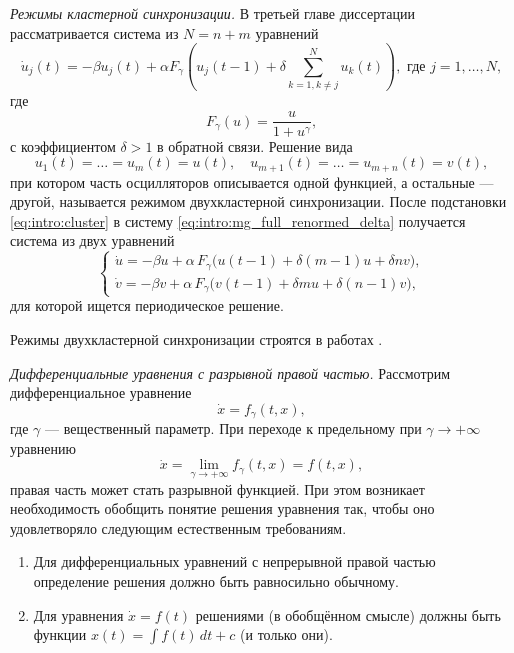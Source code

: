 \textit{Режимы кластерной синхронизации.} 
В третьей главе диссертации рассматривается система из $N = n + m$ уравнений
\begin{equation}
	\label{eq:intro:mg_full_renormed_delta}
	\dot{u}_j(t) = -\beta u_j(t) + \alpha F_{\gamma} \left(u_j(t - 1) + \delta\sum\limits_{k = 1, k\neq j}^N u_k(t)\right), \text{ где } j = 1, \dots, N,
\end{equation}
где
\[
F_{\gamma}(u) = \dfrac{u}{1 + u^{\gamma}},
\]
с коэффициентом $\delta > 1$ в обратной связи. Решение вида 
\begin{equation}
	\label{eq:intro:cluster}
	u_1(t)=\ldots=u_m(t) = u(t),\quad u_{m+1}(t)=\ldots=u_{m+n}(t) = v(t),
\end{equation}
при котором часть осцилляторов описывается одной функцией, а остальные --- другой, называется режимом двухкластерной синхронизации. После подстановки \eqref{eq:intro:cluster} в систему \eqref{eq:intro:mg_full_renormed_delta} получается система из двух уравнений
%
\begin{equation}
	\label{eq:intro:system_uv}
	\begin{cases}
		\dot{u} = -\beta u + \alpha \, F_{\gamma} \big(u(t - 1) + \delta (m - 1) u + \delta n v\big),\\
		\dot{v} = -\beta v + \alpha \, F_{\gamma} \big(v(t - 1) + \delta m u + \delta (n - 1) v\big),
	\end{cases}
\end{equation}
%
для которой ищется периодическое решение.

Режимы двухкластерной синхронизации строятся в работах \cite{Glyzin2016a, Glyzin2022}.

\textit{Дифференциальные уравнения с разрывной правой частью.} Рассмотрим дифференциальное уравнение 
\[
\dot{x} = f_{\gamma}(t, x),
\]
где $\gamma$ --- вещественный параметр. При переходе к предельному при $\gamma \to +\infty$ уравнению
\begin{equation}
	\label{eq:intro:equiv_equation_initial}
	\dot{x} = \lim\limits_{\gamma \to +\infty}f_{\gamma}(t, x) = f(t, x),
\end{equation}
правая часть может стать разрывной функцией. При этом возникает необходимость обобщить понятие решения уравнения так, чтобы оно удовлетворяло следующим естественным требованиям.
\begin{enumerate}
	\item Для дифференциальных уравнений с непрерывной правой частью определение решения должно быть равносильно обычному.
	\item Для уравнения $\dot{x} = f(t)$ решениями (в обобщённом смысле) должны быть функции $x(t) = \int f(t)\, dt + c$ (и только они).
\end{enumerate}

